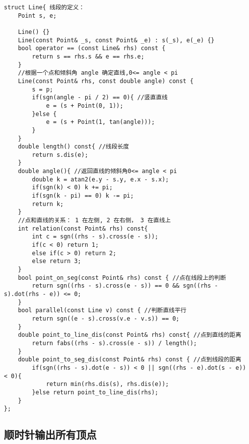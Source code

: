 \begin{lstlisting}
struct Line{ 线段的定义：
    Point s, e;

    Line() {}
    Line(const Point& _s, const Point& _e) : s(_s), e(_e) {}
    bool operator == (const Line& rhs) const {
        return s == rhs.s && e == rhs.e;
    }
    //根据一个点和倾斜角 angle 确定直线,0<= angle < pi
    Line(const Point& rhs, const double angle) const {
        s = p;
        if(sgn(angle - pi / 2) == 0){ //竖直直线
            e = (s + Point(0, 1));
        }else {
            e = (s + Point(1, tan(angle)));
        }
    }
    double length() const{ //线段长度
        return s.dis(e);
    }
    double angle(){ //返回直线的倾斜角0<= angle < pi
        double k = atan2(e.y - s.y, e.x - s.x);
        if(sgn(k) < 0) k += pi;
        if(sgn(k - pi) == 0) k -= pi;
        return k;
    }
    //点和直线的关系： 1 在左侧, 2 在右侧， 3 在直线上
    int relation(const Point& rhs) const{
        int c = sgn((rhs - s).cross(e - s));
        if(c < 0) return 1;
        else if(c > 0) return 2;
        else return 3;
    }
    bool point_on_seg(const Point& rhs) const { //点在线段上的判断
        return sgn((rhs - s).cross(e - s)) == 0 && sgn((rhs - s).dot(rhs - e)) <= 0;
    }
    bool parallel(const Line v) const { //判断直线平行
        return sgn((e - s).cross(v.e - v.s)) == 0;
    }
    double point_to_line_dis(const Point& rhs) const{ //点到直线的距离
        return fabs((rhs - s).cross(e - s)) / length();
    }
    double point_to_seg_dis(const Point& rhs) const { //点到线段的距离
        if(sgn((rhs - s).dot(e - s)) < 0 || sgn((rhs - e).dot(s - e)) < 0){
            return min(rhs.dis(s), rhs.dis(e));
        }else return point_to_line_dis(rhs);
    }
};
\end{lstlisting}

\subsection{顺时针输出所有顶点}

